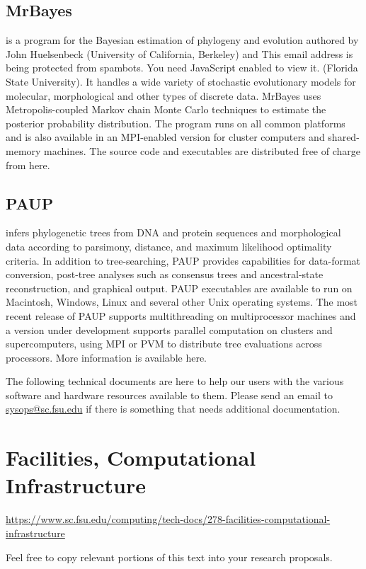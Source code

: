 \documentclass[12pt,a4paper]{article}
\begin{document}
\subsection{MrBayes}
is a program for the Bayesian estimation of phylogeny and evolution authored by John Huelsenbeck (University of California, Berkeley) and This email address is being protected from spambots. You need JavaScript enabled to view it. (Florida State University). It handles a wide variety of stochastic evolutionary models for molecular, morphological and other types of discrete data. MrBayes uses Metropolis-coupled Markov chain Monte Carlo techniques to estimate the posterior probability distribution. The program runs on all common platforms and is also available in an MPI-enabled version for cluster computers and shared-memory machines. The source code and executables are distributed free of charge from here.

\subsection{PAUP}
infers phylogenetic trees from DNA and protein sequences and morphological data according to parsimony, distance, and maximum likelihood optimality criteria. In addition to tree-searching, PAUP provides capabilities for data-format conversion, post-tree analyses such as consensus trees and ancestral-state reconstruction, and graphical output. PAUP executables are available to run on Macintosh, Windows, Linux and several other Unix operating systems. The most recent release of PAUP supports multithreading on multiprocessor machines and a version under development supports parallel computation on clusters and supercomputers, using MPI or PVM to distribute tree evaluations across processors. More information is available here.

The following technical documents are here to help our users with the various software and hardware resources available to them. Please send an email to \href{mailto:sysops@sc.fsu.edu}{sysops@sc.fsu.edu} if there is something that needs additional documentation.

\section{Facilities, Computational Infrastructure}
\url{https://www.sc.fsu.edu/computing/tech-docs/278-facilities-computational-infrastructure}

Feel free to copy relevant portions of this text into your research proposals.
\end{document}
